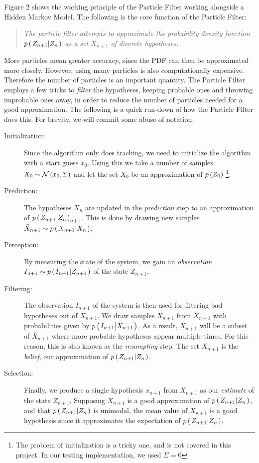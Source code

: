 Figure 2 shows the working principle of the Particle Filter working alongside a Hidden Markov Model. The following is the core function of the Particle Filter:

\begin{quote}
  \emph{The particle filter attempts to approximate the probability density function $p\left(\left. Z_{n+1} \middle\vert Z_n \right.\right)$ as a set $X_{n+1}$ of discrete hypotheses.}
\end{quote}

More particles mean greater accuracy, since the PDF can then be approximated more closely. However, using many particles is also computationally expensive. Therefore the number of particles is an important quantity. The Particle Filter employs a few tricks to \emph{filter} the hypotheses, keeping probable ones and throwing improbable ones away, in order to reduce the number of particles needed for a good approximation. The following is a quick run-down of how the Particle Filter does this. For brevity, we will commit some abuse of notation.

\begin{description}
\item[Initialization:] Since the algorithm only does tracking, we need to initialize the algorithm with a start guess $x_0$. Using this we take a number of samples $X_0 \sim \mathcal{N}\left(x_0, \Sigma\right)$ and let the set $X_0$ be an approximation of $p\left(Z_0\right)$ \footnote{The problem of initialization is a tricky one\cite{Hedvig}, and is not covered in this project. In our testing implementation, we used $\Sigma = 0$}.
\item[Prediction:] The hypotheses $X_n$ are updated in the \emph{prediction} step to an approximation of $p\left(\left. Z_{n+1} \middle\vert Z_n \right.\right)_{n+1}$. This is done by drawing new samples $\bar{X}_{n+1} \sim p\left(\left. X_{n+1} \middle\vert X_n \right.\right)$.
\item[Perception:] By measuring the state of the system, we gain an \emph{observation} $I_{n+1} \sim p\left(\left. I_{n+1} \middle\vert Z_{n+1} \right.\right)$ of the state $Z_{n+1}$.
\item[Filtering:] The observation $I_{n+1}$ of the system is then used for filtering bad hypotheses out of $\bar{X}_{n+1}$. We draw samples $X_{n+1}$ from $\bar{X}_{n+1}$ with probabilities given by $p\left(\left. I_{n+1} \middle\vert \bar{X}_{n+1} \right.\right)$. As a result, $X_{n+1}$ will be a subset of $\bar{X}_{n+1}$ where more probable hypotheses appear multiple times. For this reason, this is also known as the \emph{resampling} step. The set $X_{n+1}$ is the \emph{belief}, our approximation of $p\left(\left. Z_{n+1} \middle\vert Z_n \right.\right)$.
\item[Selection:] Finally, we produce a single hypothesis $x_{n+1}$ from $X_{n+1}$ as our \emph{estimate} of the state $Z_{n+1}$. Supposing $X_{n+1}$ is a good approximation of $p\left(\left. Z_{n+1} \middle\vert Z_n \right.\right)$, and that $p\left(\left. Z_{n+1} \middle\vert Z_n \right.\right)$ is unimodal, the mean value of $X_{n+1}$ is a good hypothesis since it approximates the expectation of $p\left(\left. Z_{n+1} \middle\vert Z_n \right.\right)$.
\end{description}


